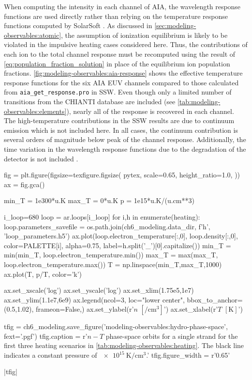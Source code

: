 When computing the intensity in each channel of AIA, the wavelength response functions are used  directly rather than relying on the temperature response functions computed by SolarSoft \citep[SSW,][]{freeland_data_1998}. As discussed in \autoref{sec:modeling-observables:atomic}, the assumption of ionization equilibrium is likely to be violated in the impulsive heating cases considered here. Thus, the contributions of each ion to the total channel response must be recomputed using the result of \autoref{eq:population_fraction_solution} in place of the equilibrium ion population fractions. \autoref{fig:modeling-observables:aia-response} shows the effective temperature response functions for the six AIA EUV channels compared to those calculated from \texttt{aia\_get\_response.pro} in SSW. Even though only a limited number of transitions from the CHIANTI database are included (see \autoref{tab:modeling-observables:elements}), nearly all of the response is recovered in each channel. The high-temperature contributions in the SSW results are due to continuum emission which is not included here. In all cases, the continuum contribution is several orders of magnitude below peak of the channel response. Additionally, the time variation in the wavelength response functions due to the degradation of the detector is not included \citep[see Section 2.1.6 of ][]{boerner_initial_2012}.

\begin{pycode}
fig = plt.figure(figsize=texfigure.figsize(
    pytex,
    scale=0.65,
    height_ratio=1.0, 
))
ax = fig.gca()

min_T = 1e300*u.K
max_T = 0*u.K
p = 1e15*u.K/(u.cm**3)

i_loop=680
loop = ar.loops[i_loop]
for i,h in enumerate(heating):
    loop.parameters_savefile = os.path.join(ch6_modeling.data_dir, f'{h}', 'loop_parameters.h5')
    ax.plot(loop.electron_temperature[:,0], loop.density[:,0], color=PALETTE[i], alpha=0.75,
            label=h.split('_')[0].capitalize())
    min_T = min(min_T, loop.electron_temperature.min())
    max_T = max(max_T, loop.electron_temperature.max())
T = np.linspace(min_T,max_T,1000)
ax.plot(T, p/T, color='k')

ax.set_xscale('log')
ax.set_yscale('log')
ax.set_xlim(1.75e5,1e7)
ax.set_ylim(1.1e7,6e9)
ax.legend(ncol=3, loc="lower center", bbox_to_anchor=(0.5,1.02), frameon=False,)
ax.set_ylabel(r'$n$ $[\si{\per\cubic\cm}]$')
ax.set_xlabel(r'$T$ $[\si{\kelvin}]$')

tfig = ch6_modeling.save_figure('modeling-observables:hydro-phase-space', fext='.pgf')
tfig.caption = r'$n-T$ phase-space orbits for a single strand for the first three heating scenarios in \autoref{tab:modeling-observables:heating}. The black line indicates a constant pressure of $\SI{e15}{\kelvin\per\cubic\cm}$.'
tfig.figure_width = r'0.65\textwidth'
\end{pycode}
|tfig|

